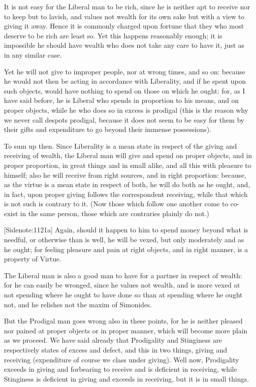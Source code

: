 It is not easy for the Liberal man to be rich, since he is neither apt
to receive nor to keep but to lavish, and values not wealth for its own
sake but with a view to giving it away. Hence it is commonly charged
upon fortune that they who most deserve to be rich are least so. Yet
this happens reasonably enough; it is impossible he should have wealth
who does not take any care to have it, just as in any similar case.

Yet he will not give to improper people, nor at wrong times, and so on:
because he would not then be acting in accordance with Liberality, and
if he spent upon such objects, would have nothing to spend on those on
which he ought: for, as I have said before, he is Liberal who spends in
proportion to his means, and on proper objects, while he who does so
in excess is prodigal (this is the reason why we never call despots
prodigal, because it does not seem to be easy for them by their gifts
and expenditure to go beyond their immense possessions).

To sum up then. Since Liberality is a mean state in respect of the
giving and receiving of wealth, the Liberal man will give and spend on
proper objects, and in proper proportion, in great things and in small
alike, and all this with pleasure to himself; also he will receive from
right sources, and in right proportion: because, as the virtue is a mean
state in respect of both, he will do both as he ought, and, in fact,
upon proper giving follows the correspondent receiving, while that which
is not such is contrary to it. (Now those which follow one another come
to co-exist in the same person, those which are contraries plainly do
not.)

[Sidenote:1121a] Again, should it happen to him to spend money beyond
what is needful, or otherwise than is well, he will be vexed, but only
moderately and as he ought; for feeling pleasure and pain at right
objects, and in right manner, is a property of Virtue.

The Liberal man is also a good man to have for a partner in respect of
wealth: for he can easily be wronged, since he values not wealth, and
is more vexed at not spending where he ought to have done so than at
spending where he ought not, and he relishes not the maxim of Simonides.

But the Prodigal man goes wrong also in these points, for he is neither
pleased nor pained at proper objects or in proper manner, which will
become more plain as we proceed. We have said already that Prodigality
and Stinginess are respectively states of excess and defect, and this in
two things, giving and receiving (expenditure of course we class under
giving). Well now, Prodigality exceeds in giving and forbearing to
receive and is deficient in receiving, while Stinginess is deficient in
giving and exceeds in receiving, but it is in small things.


